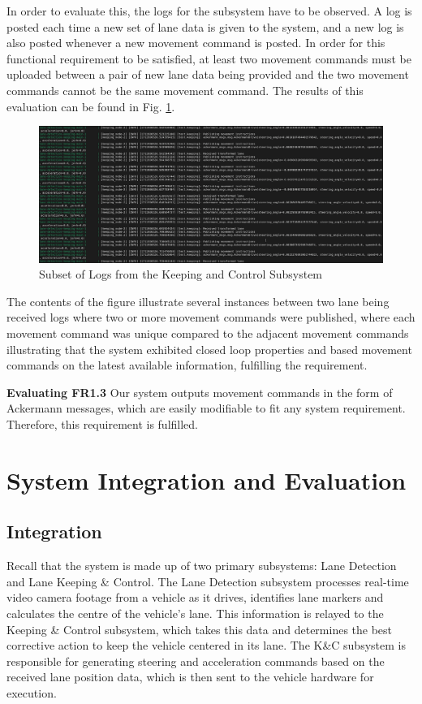 \documentclass[titlepage,draft]{article}
\begin{document}
{In order to evaluate this, the logs for the subsystem have to be observed. A log is posted each time a new set of lane data is given to the system, and a new log is also posted whenever a new movement command is posted. In order for this functional requirement to be satisfied, at least two movement commands must be uploaded between a pair of new lane data being provided and the two movement commands cannot be the same movement command. The results of this evaluation can be found in Fig. \ref{fig:fr23}.

\begin{figure}
	\centering
	\includegraphics[width=6in]{fr23}
	\caption{Subset of Logs from the Keeping and Control Subsystem }
	\label{fig:fr23}
\end{figure}

The contents of the figure illustrate several instances between two lane being received logs where two or more movement commands were published, where each movement command was unique compared to the adjacent movement commands illustrating that the system exhibited closed loop properties and based movement commands on the latest available information, fulfilling the requirement.

\textbf{Evaluating FR1.3}
Our system outputs movement commands in the form of Ackermann messages, which are easily modifiable to fit any system requirement. Therefore, this requirement is fulfilled.


\section{System Integration and Evaluation}

\subsection{Integration}
Recall that the system is made up of two primary subsystems: Lane Detection and Lane Keeping \& Control. The Lane Detection subsystem processes real-time video camera footage from a vehicle as it drives, identifies lane markers and calculates the centre of the vehicle's lane. This information is relayed to the Keeping \& Control subsystem, which takes this data and determines the best corrective action to keep the vehicle centered in its lane. The K\&C subsystem is responsible for generating steering and acceleration commands based on the received lane position data, which is then sent to the vehicle hardware for execution.


}
\end{document}
